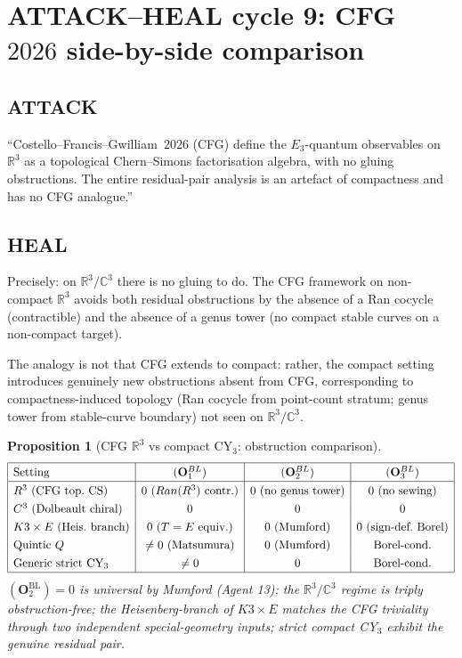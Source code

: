 \documentclass[11pt]{amsart}
\newtheorem{proposition}[theorem]{Proposition}
\newcommand{\Ran}{\mathrm{Ran}}
\newcommand{\bC}{\mathbb{C}}
\newcommand{\bR}{\mathbb{R}}
\begin{document}
\section{ATTACK--HEAL cycle 9: CFG~$2026$ side-by-side comparison}
\label{sec:cycle-9-cfg-comparison}

\subsection*{ATTACK}

``Costello--Francis--Gwilliam~$2026$ (CFG) define the $E_3$-quantum
observables on $\bR^3$ as a topological Chern--Simons factorisation
algebra, with no gluing obstructions. The entire residual-pair
analysis is an artefact of compactness and has no CFG analogue.''

\subsection*{HEAL}

Precisely: on $\bR^3 / \bC^3$ there is no gluing to do. The CFG
framework on non-compact $\bR^3$ avoids both residual obstructions
by the absence of a Ran cocycle (contractible) and the absence of
a genus tower (no compact stable curves on a non-compact target).

The analogy is not that CFG extends to compact: rather, the compact
setting introduces genuinely new obstructions absent from CFG,
corresponding to compactness-induced topology (Ran cocycle from
point-count stratum; genus tower from stable-curve boundary) not
seen on $\bR^3 / \bC^3$.

\begin{proposition}[CFG $\bR^3$ vs compact CY$_3$: obstruction
comparison]
\label{prop:cfg-vs-compact-cy3}
\[
\renewcommand{\arraystretch}{1.3}
\begin{array}{|l|c|c|c|}
\hline
\text{Setting} & (\mathbf{O}_1^{\mathrm{BL}}) &
(\mathbf{O}_2^{\mathrm{BL}}) & (\mathbf{O}_3^{\mathrm{BL}}) \\
\hline
\bR^3 \text{ (CFG top.~CS)} & 0 \text{ (}\Ran(\bR^3)
\text{ contr.)} & 0 \text{ (no genus tower)} & 0 \text{ (no sewing)} \\
\bC^3 \text{ (Dolbeault chiral)} & 0 & 0 & 0 \\
K3 \times E \text{ (Heis.\ branch)} & 0 \text{ (} T = E
\text{ equiv.)} & 0 \text{ (Mumford)} & 0 \text{ (sign-def.~Borel)} \\
\text{Quintic } Q & \neq 0 \text{ (Matsumura)} & 0 \text{ (Mumford)} &
\text{Borel-cond.} \\
\text{Generic strict CY}_3 & \neq 0 & 0 & \text{Borel-cond.} \\
\hline
\end{array}
\]
$(\mathbf{O}_2^{\mathrm{BL}}) = 0$ is universal by Mumford (Agent 13);
the $\bR^3 / \bC^3$ regime is triply obstruction-free; the
Heisenberg-branch of $K3 \times E$ matches the CFG triviality
through two independent special-geometry inputs; strict compact
CY$_3$ exhibit the genuine residual pair.
\end{proposition}
\end{document}
